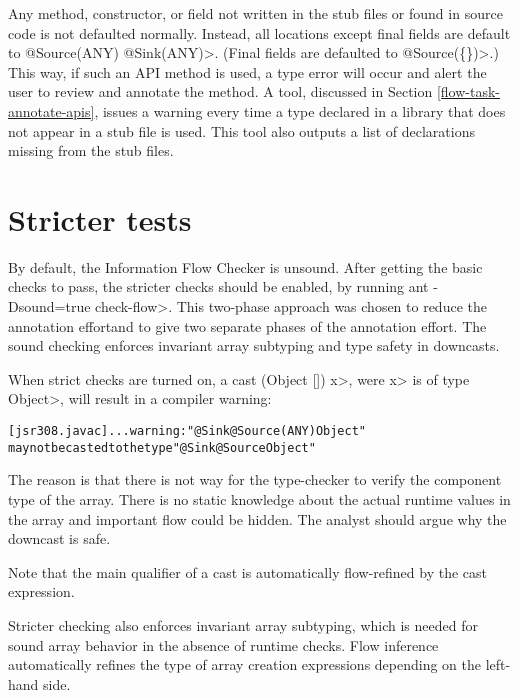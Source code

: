 Any method, constructor, or field  not written in the stub files or found in source code is not defaulted normally. 
 Instead,  all locations except final fields are default to \<@Source(ANY) @Sink(ANY)>.  
 (Final fields are defaulted to \<@Source(\{\})>.)
 This way, if such an API method is used, a type error
  will occur and alert the user to review and annotate the method. 
  A tool, discussed in Section \ref{flow-task-annotate-apis}, issues a warning every time a type declared in a 
  library that does not appear in a stub file is used.  This tool also outputs a list of declarations missing from
  the stub files. 
 
\section{Stricter tests\label{sec:stricter}}

By default, the Information Flow Checker is unsound.  After getting the basic checks to pass, the
 stricter checks should be enabled, by running \<ant -Dsound=true check-flow>.
This two-phase approach was chosen to reduce
the annotation effortand to give two separate phases of
the annotation effort.
 The sound checking enforces invariant 
array subtyping and type safety in downcasts.


When strict checks are turned on,
a cast \<(Object []) x>, were \<x> is of type \<Object>, will result
in a compiler warning:

\begin{alltt}
[jsr308.javac] ... warning: "@Sink @Source({ANY}) Object"
       may not be casted to the type "@Sink @Source Object"
\end{alltt}

The reason is that there is not way for the type-checker to verify
 the component type of the array. There is no static knowledge about the actual
runtime values in the array and important flow could be hidden.
The analyst should argue why the downcast is safe.

Note that the main qualifier of a cast is automatically flow-refined
by the cast expression.


\medskip

Stricter checking also enforces invariant array subtyping, which is
needed for sound array behavior in the absence of runtime checks.
Flow inference automatically refines the type of array creation
expressions depending on the left-hand side.

\medskip




